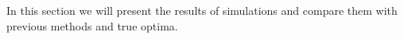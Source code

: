 In this section we will present the results of simulations and compare them with previous methods and true optima.